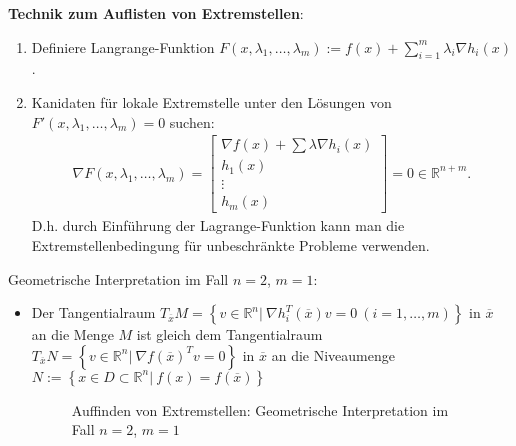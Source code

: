 \textbf{Technik zum Auflisten von Extremstellen}:
\begin{enumerate}
  \item Definiere Langrange-Funktion $F(x,\lambda_1,\ldots,\lambda_m):=f(x)+\sum\limits_{i=1}^m\lambda_i\nabla h_i(x)$.
  \item Kanidaten für lokale Extremstelle unter den Lösungen von\\ $F'(x,\lambda_1,\ldots,\lambda_m)=0$ suchen:
	\begin{align*}
	\nabla F(x,\lambda_1,\ldots,\lambda_m)=\begin{bmatrix}
	\nabla f(x)+\sum\lambda\nabla h_i(x)\\
	h_1(x)\\
	\vdots\\
	h_m(x)
	\end{bmatrix} = 0\in\mathbb{R}^{n+m}.
	\end{align*}
	D.h. durch Einführung der Lagrange-Funktion kann man die Extremstellenbedingung für unbeschränkte Probleme verwenden. 
\end{enumerate}
Geometrische Interpretation im Fall $n=2$, $m=1$:
\begin{itemize}
  \item[] Der Tangentialraum $T_{\overline{x}}M=\left\{v\in\mathbb{R}^n|\ \nabla h_i^T(\overline{x})v=0\ (i=1,\ldots,m) \right\} $ in $\overline{x}$ an die Menge $M$ ist gleich dem
  Tangentialraum $T_{\overline{x}}N=\left\{ v\in\mathbb{R}^n|\ \nabla f(\overline{x})^Tv=0 \right\}$ in $\overline{x}$ an die Niveaumenge $N :=\left\{x\in D\subset\mathbb{R}^n|\
  f(x)=f(\overline{x})\right\}$
	\begin{figure}[htb]
	\centering
		
		\caption{Auffinden von Extremstellen: Geometrische Interpretation im Fall $n=2$, $m=1$}
		\label{fig:kap_1_tangraum}
	\end{figure}
\end{itemize}

